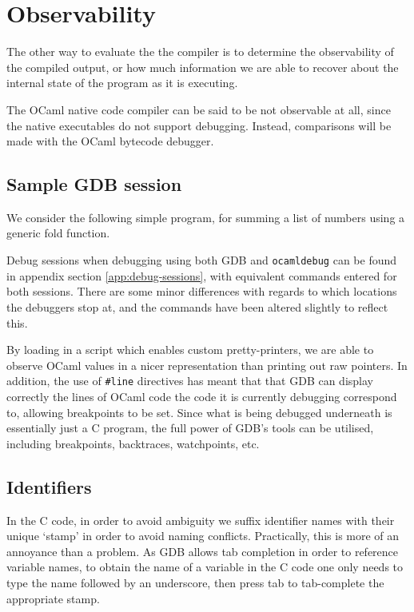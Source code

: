 \documentclass[12pt,a4paper,twoside,openright]{report}
\begin{document}
\section{Observability}

The other way to evaluate the the compiler is to determine the observability of 
the compiled output, or how much information we are able to recover about the 
internal state of the program as it is executing.

The OCaml native code compiler can be said to be not observable at all, since 
the native executables do not support debugging. Instead, comparisons will be 
made with the OCaml bytecode debugger.

\subsection{Sample GDB session}

We consider the following simple program, for summing a list of numbers using a 
generic fold function.



Debug sessions when debugging using both GDB and \texttt{ocamldebug} can be 
found in appendix section \ref{app:debug-sessions}, with equivalent commands 
entered for both sessions. There are some minor differences with regards to 
which locations the debuggers stop at, and the commands have been altered 
slightly to reflect this.

By loading in a script which enables custom pretty-printers, we are able to 
observe OCaml values in a nicer representation than printing out raw pointers. 
In addition, the use of \texttt{\#}\texttt{line} directives has meant that that 
GDB can display correctly the lines of OCaml code the code it is currently 
debugging correspond to, allowing breakpoints to be set. Since what is being 
debugged underneath is essentially just a C program, the full power of GDB's 
tools can be utilised, including breakpoints, backtraces, watchpoints, etc.

\subsection{Identifiers}

In the C code, in order to avoid ambiguity we suffix identifier names with 
their unique `stamp' in order to avoid naming conflicts. Practically, this is 
more of an annoyance than a problem. As GDB allows tab completion in order to 
reference variable names, to obtain the name of a variable in the C code one 
only needs to type the name followed by an underscore, then press tab to 
tab-complete the appropriate stamp.
\end{document}
